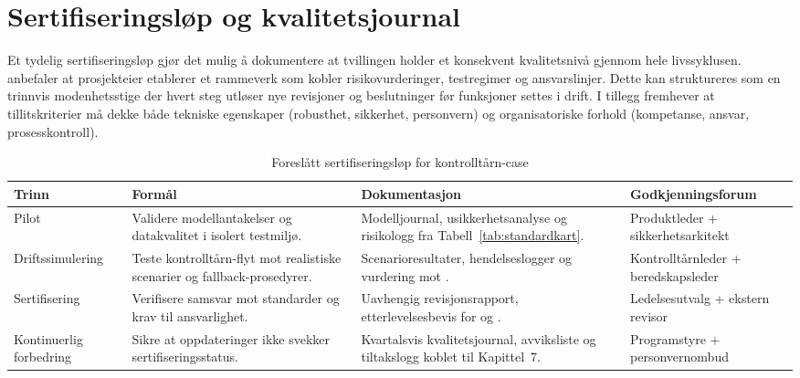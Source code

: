 \section{Sertifiseringsløp og kvalitetsjournal}
Et tydelig sertifiseringsløp gjør det mulig å dokumentere at tvillingen holder et konsekvent kvalitetsnivå gjennom hele livssyklusen. \citet{dnv2023digitalassurance} anbefaler at prosjekteier etablerer et rammeverk som kobler risikovurderinger, testregimer og ansvarslinjer. Dette kan struktureres som en trinnvis modenhetsstige der hvert steg utløser nye revisjoner og beslutninger før funksjoner settes i drift. I tillegg fremhever \citet{iso2020tr24028} at tillitskriterier må dekke både tekniske egenskaper (robusthet, sikkerhet, personvern) og organisatoriske forhold (kompetanse, ansvar, prosesskontroll).

\begin{table}[ht]
    \centering
    \caption{Foreslått sertifiseringsløp for kontrolltårn-case}
    \label{tab:sertifiseringslop}
    \begin{tabular}{p{2.2cm}p{4.3cm}p{4.5cm}p{3.0cm}}
        \toprule
        \textbf{Trinn} & \textbf{Formål} & \textbf{Dokumentasjon} & \textbf{Godkjenningsforum} \\
        \midrule
        Pilot & Validere modellantakelser og datakvalitet i isolert testmiljø. & Modelljournal, usikkerhetsanalyse og risikologg fra Tabell~\ref{tab:standardkart}. & Produktleder + sikkerhetsarkitekt \\
        \addlinespace
        Driftssimulering & Teste kontrolltårn-flyt mot realistiske scenarier og fallback-prosedyrer. & Scenarioresultater, hendelseslogger og vurdering mot \citet{nist2023airmf}. & Kontrolltårnleder + beredskapsleder \\
        \addlinespace
        Sertifisering & Verifisere samsvar mot standarder og krav til ansvarlighet. & Uavhengig revisjonsrapport, etterlevelsesbevis for \citet{iso2020tr24028} og \citet{dnv2023digitalassurance}. & Ledelsesutvalg + ekstern revisor \\
        \addlinespace
        Kontinuerlig forbedring & Sikre at oppdateringer ikke svekker sertifiseringsstatus. & Kvartalsvis kvalitetsjournal, avviksliste og tiltakslogg koblet til Kapittel~7. & Programstyre + personvernombud \\
        \bottomrule
    \end{tabular}
\end{table}

